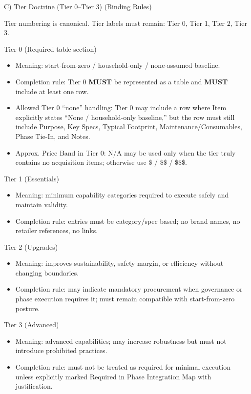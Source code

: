 \documentclass[10pt]{article}
\begin{document}
C) Tier Doctrine (Tier 0–Tier 3) (Binding Rules)

Tier numbering is canonical. Tier labels must remain: Tier 0, Tier 1, Tier 2, Tier 3.

Tier 0 (Required table section)

\begin{itemize}
\item Meaning: start-from-zero / household-only / none-assumed baseline.
\item Completion rule: Tier 0 \textbf{MUST} be represented as a table and \textbf{MUST} include at least one row.
\item Allowed Tier 0 “none” handling: Tier 0 may include a row where Item explicitly states “None / household-only baseline,” but the row must still include Purpose, Key Specs, Typical Footprint, Maintenance/Consumables, Phase Tie-In, and Notes.
\item Approx. Price Band in Tier 0: N/A may be used only when the tier truly contains no acquisition items; otherwise use \$ / \$\$ / \$\$\$.
\end{itemize}

Tier 1 (Essentials)

\begin{itemize}
\item Meaning: minimum capability categories required to execute safely and maintain validity.
\item Completion rule: entries must be category/spec based; no brand names, no retailer references, no links.
\end{itemize}

Tier 2 (Upgrades)

\begin{itemize}
\item Meaning: improves sustainability, safety margin, or efficiency without changing boundaries.
\item Completion rule: may indicate mandatory procurement when governance or phase execution requires it; must remain compatible with start-from-zero posture.
\end{itemize}

Tier 3 (Advanced)

\begin{itemize}
\item Meaning: advanced capabilities; may increase robustness but must not introduce prohibited practices.
\item Completion rule: must not be treated as required for minimal execution unless explicitly marked Required in Phase Integration Map with justification.
\end{itemize}
\end{document}
